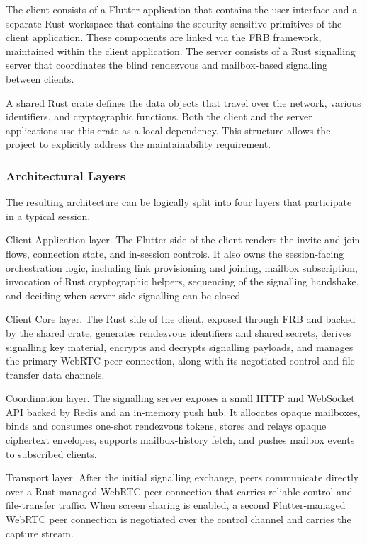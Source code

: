 \documentclass[12pt,a4paper]{article}
\begin{document}
The client consists of a Flutter application that contains the user interface and a separate Rust workspace that contains the security-sensitive primitives of the client application. These components are linked via the FRB framework, maintained within the client application. The server consists of a Rust signalling server that coordinates the blind rendezvous and mailbox-based signalling between clients.

A shared Rust crate defines the data objects that travel over the network, various identifiers, and cryptographic functions. Both the client and the server applications use this crate as a local dependency. This structure allows the project to explicitly address the maintainability requirement.

\subsubsection{Architectural Layers}

The resulting architecture can be logically split into four layers that participate in a typical session.

Client Application layer. The Flutter side of the client renders the invite and join flows, connection state, and in-session controls. It also owns the session-facing orchestration logic, including link provisioning and joining, mailbox subscription, invocation of Rust cryptographic helpers, sequencing of the signalling handshake, and deciding when server-side signalling can be closed

Client Core layer. The Rust side of the client, exposed through FRB and backed by the shared crate, generates rendezvous identifiers and shared secrets, derives signalling key material, encrypts and decrypts signalling payloads, and manages the primary WebRTC peer connection, along with its negotiated control and file-transfer data channels.

Coordination layer. The signalling server exposes a small HTTP and WebSocket API backed by Redis and an in-memory push hub. It allocates opaque mailboxes, binds and consumes one-shot rendezvous tokens, stores and relays opaque ciphertext envelopes, supports mailbox-history fetch, and pushes mailbox events to subscribed clients.

Transport layer. After the initial signalling exchange, peers communicate directly over a Rust-managed WebRTC peer connection that carries reliable control and file-transfer traffic. When screen sharing is enabled, a second Flutter-managed WebRTC peer connection is negotiated over the control channel and carries the capture stream.
\end{document}
